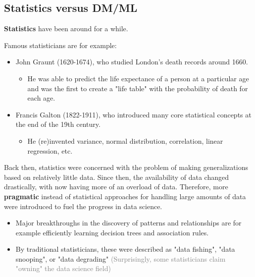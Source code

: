 \subsection{Statistics versus DM/ML}

\textbf{Statistics} have been around for a while. \begin{note}Famous statisticians are for example:
\begin{itemize}
  \item John Graunt (1620-1674), who studied London's death records around 1660.
  \begin{itemize}
    \item He was able to predict the life expectance of a person at a particular age and was the first to create a "life table" with the probability of death for each age.
  \end{itemize}
  \item Francis Galton (1822-1911), who introduced many core statistical concepts at the end of the 19th century.
  \begin{itemize}
    \item He (re)invented variance, normal distribution, correlation, linear regression, etc.
  \end{itemize}
\end{itemize}
\end{note}

Back then, statistics were concerned with the problem of making generalizations based on relatively little data. Since then, the availability of data changed drastically, with now having more of an overload of data. Therefore, more \textbf{pragmatic} instead of statistical approaches for handling large amounts of data were introduced to fuel the progress in data science.
\begin{itemize}
  \item Major breakthroughs in the discovery of patterns and relationships are for example efficiently learning decision trees and association rules.
  \item By traditional statisticians, these were described as "data fishing", "data snooping", or "data degrading" \textcolor{gray}{\footnotesize(Surprisingly, some statisticians claim "owning" the data science field)}
\end{itemize}

